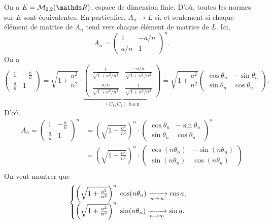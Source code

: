 \begin{exo}
	On a $E = \mathcal{M}_{2,2}(\R)$, espace de dimension finie.
	D'où, toutes les normes sur $E$\/ sont équivalentes.
	En particulier, $A_n \to L$\/ si, et seulement si chaque élément de matrice de $A_n$\/ tend vers chaque élément de matrice de $L$.
	Ici, \[
		A_n = \begin{pmatrix}
			1 & -a / n\\
			a / n & 1
		\end{pmatrix}^n
	.\]
	On a \[
		\begin{pmatrix}
			1 & - \frac{a}{n}\\
			\frac{a}{n} & 1
		\end{pmatrix} = \sqrt{1 + \frac{a^2}{n^2}}  \cdot \underbrace{\begin{pmatrix}
			\frac{1}{\sqrt{1 + a^2 / n^2}} & \frac{- a / n}{\sqrt{1 + a^2 / n^2}}\\
			\frac{a / n}{\sqrt{1 + a^2 / n^2}} & \frac{1}{\sqrt{1 + a^2 / n^2}}
		\end{pmatrix}}_{(C_1, C_2) \text{ b.o.n}} = \sqrt{1 + \frac{a^2}{n^2}} \begin{pmatrix}
			\cos \theta_n & -\sin \theta_n\\
			\sin \theta_n & \cos \theta_n
		\end{pmatrix} 
	.\] D'où,
	\begin{align*}
		A_n = \begin{pmatrix}
			1 & - \frac{a}{n}\\
			\frac{a}{n} & 1
		\end{pmatrix}^n &= \left( \sqrt{1 + \frac{a^2}{n^2}} \right)^n \cdot \begin{pmatrix}
			\cos \theta_n & -\sin\theta_n\\
			\sin \theta_n & \cos \theta_n
		\end{pmatrix}^n\\
		&= \left( \sqrt{1 + \frac{a^2}{n^2}} \right)^n \cdot \begin{pmatrix}
			\cos (n\theta_n) & -\sin(n\theta_n)\\
			\sin (n\theta_n) & \cos (n\theta_n)
		\end{pmatrix}\\
	\end{align*}
	On veut montrer que \[
		\begin{cases}
			\left(\sqrt{1 + \frac{a^2}{n^2}}\right)^n \; \cos(n \theta_n) \xrightarrow[n\to \infty]{} \cos a,\\
			\left(\sqrt{1 + \frac{a^2}{n^2}}\right)^n \; \sin(n\theta_n) \xrightarrow[n\to \infty]{} \sin a.

\end{cases}\]
\end{exo}
